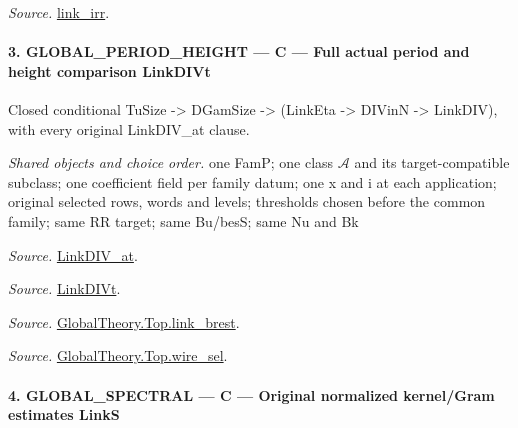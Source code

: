 \documentclass[11pt,a4paper]{article}
\numberwithin{equation}{section}
\theoremstyle{remark}\newtheorem{remark}[theorem]{Remark}
\begin{document}
\emph{Source.} \href{https://github.com/CocoSgt/riemann-hypothesis-lean/blob/7cbf7a0c32fca1badf05931879a37c3f8a2b03b4/src/Development/AbelianVarietyTheory/Proofs/GlobalInterpolation/LinkIRROfJoinEx.lean#L143-L166}{link\_\allowbreak irr}.



\paragraph{3. GLOBAL\_\allowbreak PERIOD\_\allowbreak HEIGHT — C — Full actual period and height comparison LinkDIVt}

Closed conditional TuSize -> DGamSize -> (LinkEta -> DIVinN -> LinkDIV), with every original LinkDIV\_\allowbreak at clause.

\emph{Shared objects and choice order.} one FamP; one class $\mathcal A$ and its target-compatible subclass; one coefficient field per family datum; one x and i at each application; original selected rows, words and levels; thresholds chosen before the common family; same RR target; same Bu/besS; same Nu and Bk

\emph{Source.} \href{https://github.com/CocoSgt/riemann-hypothesis-lean/blob/7cbf7a0c32fca1badf05931879a37c3f8a2b03b4/src/Formalism/SharpRestriction/GlobalTheoremInputs.lean#L77-L90}{LinkDIV\_\allowbreak at}.

\emph{Source.} \href{https://github.com/CocoSgt/riemann-hypothesis-lean/blob/7cbf7a0c32fca1badf05931879a37c3f8a2b03b4/src/Formalism/SharpRestriction/GlobalTheoremInputs.lean#L94-L96}{LinkDIVt}.

\emph{Source.} \href{https://github.com/CocoSgt/riemann-hypothesis-lean/blob/7cbf7a0c32fca1badf05931879a37c3f8a2b03b4/src/Development/AbelianVarietyTheory/Proofs/GlobalInterpolation/LinkBrest.lean#L7-L25}{GlobalTheory.Top.link\_\allowbreak brest}.

\emph{Source.} \href{https://github.com/CocoSgt/riemann-hypothesis-lean/blob/7cbf7a0c32fca1badf05931879a37c3f8a2b03b4/src/Development/AbelianVarietyTheory/Proofs/GlobalInterpolation/WireSel.lean#L11-L41}{GlobalTheory.Top.wire\_\allowbreak sel}.



\paragraph{4. GLOBAL\_\allowbreak SPECTRAL — C — Original normalized kernel/Gram estimates LinkS}
\end{document}
